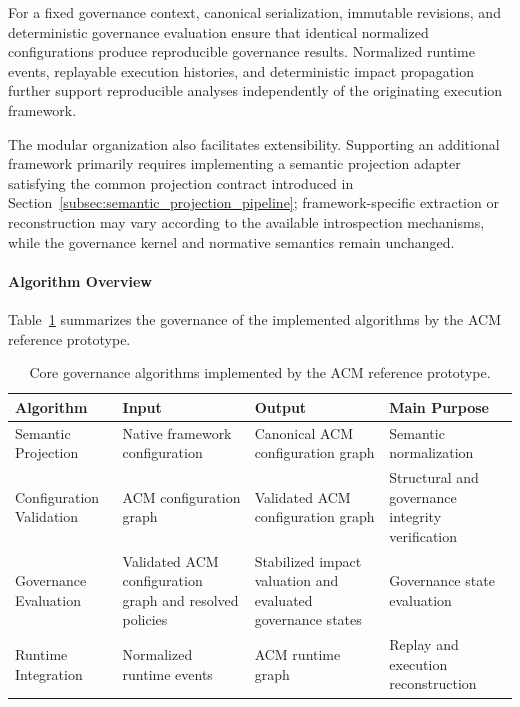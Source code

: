 \documentclass[10pt]{article}
\begin{document}
For a fixed governance context, canonical serialization, immutable revisions, and
deterministic governance evaluation ensure that identical normalized
configurations produce reproducible governance results. Normalized runtime
events, replayable execution histories, and deterministic impact propagation
further support reproducible analyses independently of the originating execution
framework.

The modular organization also facilitates extensibility. Supporting an
additional framework primarily requires implementing a semantic projection
adapter satisfying the common projection contract introduced in
Section~\ref{subsec:semantic_projection_pipeline}; framework-specific extraction
or reconstruction may vary according to the available introspection mechanisms,
while the governance kernel and normative semantics remain unchanged.

\paragraph{Algorithm Overview}
Table~\ref{tab:governance_algorithms} summarizes the governance of the implemented algorithms by the ACM reference prototype.

\begin{table}[t]
	\centering
	\caption{Core governance algorithms implemented by the ACM reference prototype.}
	\label{tab:governance_algorithms}
	\small
	\renewcommand{\arraystretch}{1.15}
	\begin{tabularx}{\columnwidth}{>{\raggedright\arraybackslash}p{2.8cm}XX>{\raggedright\arraybackslash}p{2.6cm}}
		\toprule
		\textbf{Algorithm} &
		\textbf{Input} &
		\textbf{Output} &
		\textbf{Main Purpose} \\
		\midrule
		
		Semantic Projection &
		Native framework configuration &
		Canonical ACM configuration graph &
		Semantic normalization \\
		
		Configuration Validation &
		ACM configuration graph &
		Validated ACM configuration graph &
		Structural and governance integrity verification \\
		
		Governance Evaluation &
		Validated ACM configuration graph and resolved policies &
		Stabilized impact valuation and evaluated governance states &
		Governance state evaluation \\
		
		Runtime Integration &
		Normalized runtime events &
		ACM runtime graph &
		Replay and execution reconstruction \\
		
		\bottomrule
	\end{tabularx}
\end{table}
\end{document}

